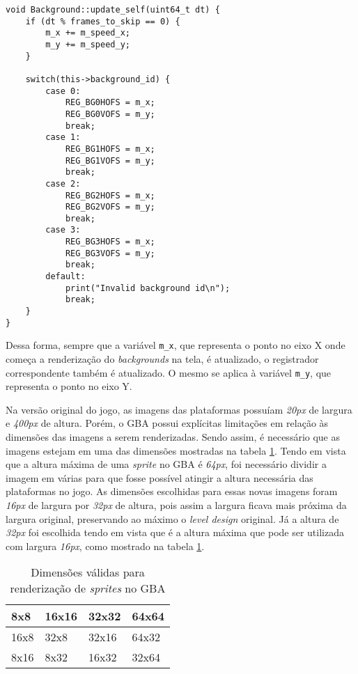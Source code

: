 \begin{lstlisting}[caption={Método responsável por atualizar os índices de renderização do \textit{background}},label={lst:update_bg}]
void Background::update_self(uint64_t dt) {
    if (dt % frames_to_skip == 0) {
        m_x += m_speed_x;
        m_y += m_speed_y;
    }

    switch(this->background_id) {
        case 0:
            REG_BG0HOFS = m_x;
            REG_BG0VOFS = m_y;
            break;
        case 1:
            REG_BG1HOFS = m_x;
            REG_BG1VOFS = m_y;
            break;
        case 2:
            REG_BG2HOFS = m_x;
            REG_BG2VOFS = m_y;
            break;
        case 3:
            REG_BG3HOFS = m_x;
            REG_BG3VOFS = m_y;
            break;
        default:
            print("Invalid background id\n");
            break;
    }
}
\end{lstlisting}

Dessa forma, sempre que a variável \texttt{m\_x}, que representa o ponto no eixo X onde começa a renderização do \textit{backgrounds} na tela, é atualizado, o registrador correspondente também é atualizado. O mesmo se aplica à variável \texttt{m\_y}, que representa o ponto no eixo Y.

Na versão original do jogo, as imagens das plataformas possuíam \textit{20px} de largura e \textit {400px} de altura. Porém, o GBA possui explícitas limitações em relação às dimensões das imagens a serem renderizadas. Sendo assim, é necessário que as imagens estejam em uma das dimensões mostradas na tabela \ref{table:sprite-sizes}. Tendo em vista que a altura máxima de uma \textit{sprite} no GBA é \textit{64px}, foi necessário dividir a imagem em várias para que fosse possível atingir a altura necessária das plataformas no jogo. As dimensões escolhidas para essas novas imagens foram \textit{16px} de largura por \textit{32px} de altura, pois assim a largura ficava mais próxima da largura original, preservando ao máximo o \textit{level design} original. Já a altura de \textit{32px} foi escolhida tendo em vista que é a altura máxima que pode ser utilizada com largura \textit{16px}, como mostrado na tabela \ref{table:sprite-sizes}.

\begin{table}[htb]
\center
\begin{tabular}{|l|l|l|l|}
\hline
8x8  & 16x16 & 32x32 & 64x64 \\ \hline
16x8 & 32x8  & 32x16 & 64x32 \\ \hline
8x16 & 8x32  & 16x32 & 32x64 \\ \hline
\end{tabular}
\caption{Dimensões válidas para renderização de \textit{sprites} no GBA}
\label{table:sprite-sizes}
\end{table}

